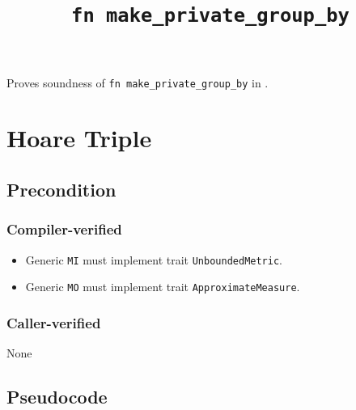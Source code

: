 \documentclass{article}
\title{\texttt{fn make\_private\_group\_by}}
\author{\MichaelShoemateAuthor}
\date{}
\begin{document}
\maketitle

\contrib
Proves soundness of \texttt{fn make\_private\_group\_by} in .

\section{Hoare Triple}
\subsection*{Precondition}
\subsubsection*{Compiler-verified}
\begin{itemize}
    \item Generic \texttt{MI} must implement trait \texttt{UnboundedMetric}.
    \item Generic \texttt{MO} must implement trait \texttt{ApproximateMeasure}.
\end{itemize}

\subsubsection*{Caller-verified}
None

\subsection*{Pseudocode}

\end{document}
